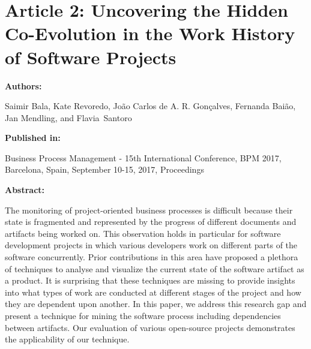 \chapter{Article 2: Uncovering the Hidden Co-Evolution in the Work History of Software Projects}

{\bfseries \Large Authors:}

\noindent Saimir Bala, Kate Revoredo, 
Jo\~{a}o Carlos de A. R. Gon\c{c}alves,
Fernanda Bai\~{a}o,
Jan Mendling, and Flavia~Santoro \hfill

\bigskip

{\noindent\bfseries \Large Published in: \medskip}

\noindent Business Process Management - 15th International Conference, {BPM}
2017, Barcelona, Spain, September 10-15, 2017, Proceedings

\bigskip

{\noindent\bfseries \Large Abstract: \medskip}


\noindent The monitoring of project-oriented business processes is difficult because their state is fragmented and represented by the progress of different documents and artifacts being worked on. This observation holds in particular for software development projects in which various developers work on different parts of the software concurrently. Prior contributions in this area have proposed a plethora of techniques to analyse and visualize the current state of the software artifact as a product. It is surprising that these techniques are missing to provide insights into what types of work are conducted at different stages of the project and how they are dependent upon another. In this paper, we address this research gap and present a technique for mining the software process including dependencies between artifacts. Our evaluation of various open-source projects demonstrates the applicability of our technique. 


\pagebreak





